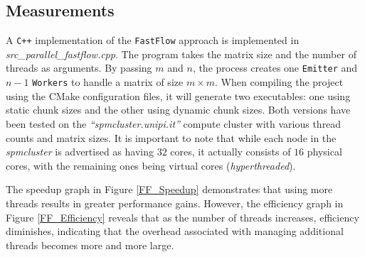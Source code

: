 \subsection*{Measurements}
A \texttt{C++} implementation of the \texttt{FastFlow} approach is implemented in \textit{src\_parallel\_fastflow.cpp}. The program takes the matrix size and the number of threads as arguments. By passing $m$ and $n$, the process creates one \texttt{Emitter} and $n - 1$ \texttt{Workers} to handle a matrix of size $m \times m$. When compiling the project using the CMake configuration files, it will generate two executables: one using static chunk sizes and the other using dynamic chunk sizes. Both versions have been tested on the \textit{``spmcluster.unipi.it''} compute cluster with various thread counts and matrix sizes. It is important to note that while each node in the \textit{spmcluster} is advertised as having $32$ cores, it actually consists of $16$ physical cores, with the remaining ones being virtual cores (\textit{hyperthreaded}).
\par 
The speedup graph in Figure \ref{FF_Speedup} demonstrates that using more threads results in greater performance gains. However, the efficiency graph in Figure \ref{FF_Efficiency} reveals that as the number of threads increases, efficiency diminishes, indicating that the overhead associated with managing additional threads becomes more and more large. 

